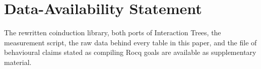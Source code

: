 \section*{Data-Availability Statement}


The rewritten coinduction library, both ports of Interaction Trees, the
measurement script, the raw data behind every table in this paper, and the file
of behavioural claims stated as compiling Rocq goals are available as
supplementary material.

\begin{acks}
\end{acks}
